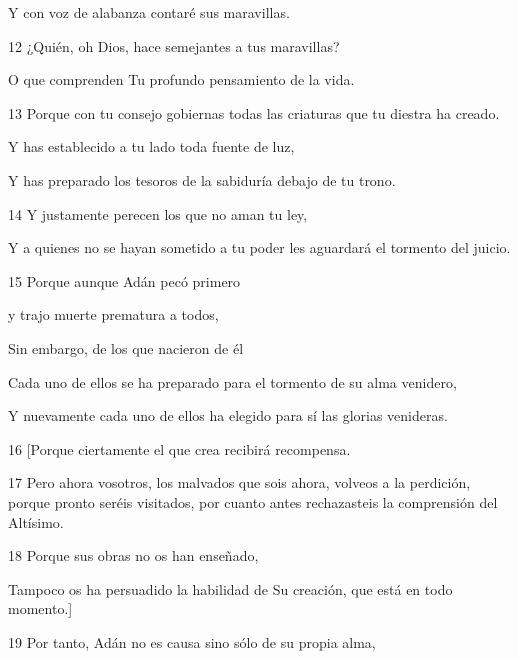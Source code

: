 \par Y con voz de alabanza contaré sus maravillas.

\par 12 ¿Quién, oh Dios, hace semejantes a tus maravillas?

\par O que comprenden Tu profundo pensamiento de la vida.

\par 13 Porque con tu consejo gobiernas todas las criaturas que tu diestra ha creado.

\par Y has establecido a tu lado toda fuente de luz,

\par Y has preparado los tesoros de la sabiduría debajo de tu trono.

\par 14 Y justamente perecen los que no aman tu ley,

\par Y a quienes no se hayan sometido a tu poder les aguardará el tormento del juicio.

\par 15 Porque aunque Adán pecó primero

\par y trajo muerte prematura a todos,

\par Sin embargo, de los que nacieron de él

\par Cada uno de ellos se ha preparado para el tormento de su alma venidero,

\par Y nuevamente cada uno de ellos ha elegido para sí las glorias venideras.

\par 16 [Porque ciertamente el que crea recibirá recompensa.

\par 17 Pero ahora vosotros, los malvados que sois ahora, volveos a la perdición, porque pronto seréis visitados, por cuanto antes rechazasteis la comprensión del Altísimo.

\par 18 Porque sus obras no os han enseñado,

\par Tampoco os ha persuadido la habilidad de Su creación, que está en todo momento.]

\par 19 Por tanto, Adán no es causa sino sólo de su propia alma,

